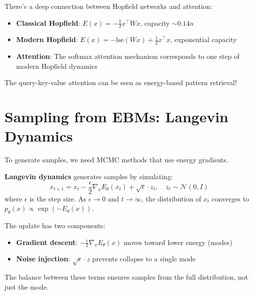 \begin{remark}
    There's a deep connection between Hopfield networks and attention:
    \begin{itemize}
        \item \textbf{Classical Hopfield}: $E(x) = -\frac{1}{2}x^\top W x$, capacity $\sim 0.14n$
        \item \textbf{Modern Hopfield}: $E(x) = -\text{lse}(Wx) + \frac{1}{2}x^\top x$, exponential capacity
        \item \textbf{Attention}: The softmax attention mechanism corresponds to one step of modern Hopfield dynamics
    \end{itemize}
    The query-key-value attention can be seen as energy-based pattern retrieval!
\end{remark}

\section{Sampling from EBMs: Langevin Dynamics}

To generate samples, we need MCMC methods that use energy gradients.

\begin{definition}
    \textbf{Langevin dynamics} generates samples by simulating:
    \[
        x_{t+1} = x_t - \frac{\epsilon}{2} \nabla_x E_\theta(x_t) + \sqrt{\epsilon} \cdot z_t, \quad z_t \sim \mathcal{N}(0, I)
    \]
    where $\epsilon$ is the step size. As $\epsilon \to 0$ and $t \to \infty$, the distribution of $x_t$ converges to $p_\theta(x) \propto \exp(-E_\theta(x))$.
\end{definition}

\begin{remark}
    The update has two components:
    \begin{itemize}
        \item \textbf{Gradient descent}: $-\frac{\epsilon}{2} \nabla_x E_\theta(x)$ moves toward lower energy (modes)
        \item \textbf{Noise injection}: $\sqrt{\epsilon} \cdot z$ prevents collapse to a single mode
    \end{itemize}
    The balance between these terms ensures samples from the full distribution, not just the mode.
\end{remark}

